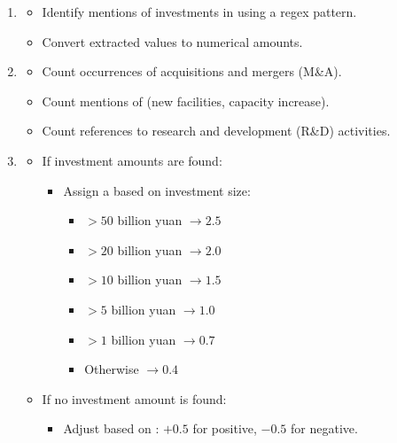 \documentclass[3p,times,procedia]{elsarticle}
\begin{document}
 \cite{Daniel1998}
\begin{enumerate}
    \item {}
    \begin{itemize}
        \item Identify mentions of investments in  using a regex pattern.
        \item Convert extracted values to numerical amounts.
    \end{itemize}

    \item {}
    \begin{itemize}
        \item Count occurrences of acquisitions and mergers (M\&A).
        \item Count mentions of  (new facilities, capacity increase).
        \item Count references to research and development (R\&D) activities.
    \end{itemize}

    \item {}
    \begin{itemize}
        \item If investment amounts are found:
        \begin{itemize}
            \item Assign a  based on investment size:
            \begin{itemize}
                \item $> 50$ billion yuan $\rightarrow 2.5$
                \item $> 20$ billion yuan $\rightarrow 2.0$
                \item $> 10$ billion yuan $\rightarrow 1.5$
                \item $> 5$ billion yuan $\rightarrow 1.0$
                \item $> 1$ billion yuan $\rightarrow 0.7$
                \item Otherwise $\rightarrow 0.4$
            \end{itemize}
        \end{itemize}
        \item If no investment amount is found:
        \begin{itemize}
            \item Adjust based on : $+0.5$ for positive, $-0.5$ for negative.
        \end{itemize}
    \end{itemize}


\end{enumerate}
\end{document}
